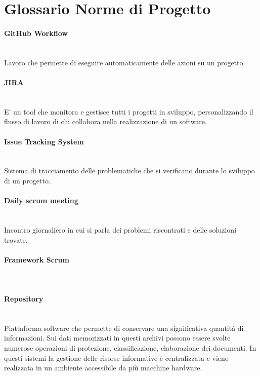 \section{Glossario Norme di Progetto}

\paragraph{GitHub Workflow}~\smallskip \\
Lavoro che permette di eseguire automaticamente delle azioni su un progetto.

\paragraph{JIRA}~\smallskip \\
E' un tool che monitora e gestisce tutti i progetti in sviluppo, personalizzando il flusso di lavoro di chi collabora nella realizzazione di un software.

\paragraph{Issue Tracking System}~\smallskip \\
Sistema di tracciamento delle problematiche che si verificano durante lo sviluppo di un progetto.

\paragraph{Daily scrum meeting}~\smallskip \\
Incontro giornaliero in cui si parla dei problemi riscontrati e delle soluzioni trovate.

\paragraph{Framework Scrum}~\smallskip \\

\paragraph{Repository}~\smallskip \\
Piattaforma software che permette di conservare una significativa quantità di informazioni. Sui dati memorizzati in questi archivi possono essere svolte numerose operazioni di protezione, classificazione, elaborazione dei documenti. In questi sistemi la gestione delle risorse informative è centralizzata e viene realizzata in un ambiente accessibile da più macchine hardware.

